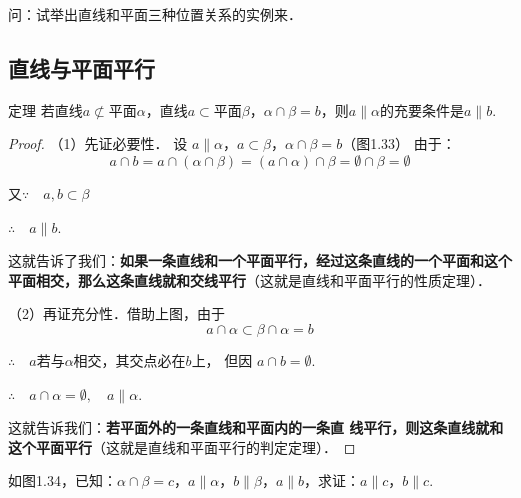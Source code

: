问：试举出直线和平面三种位置关系的实例来．

\subsection{直线与平面平行}
\begin{blk}
  {定理}
  若直线$a\not\subset$平面$\alpha$，直线$a\subset$平面$\beta$，$\alpha\cap \beta=b$，则$a\parallel\alpha$的充要条件是$a\parallel b$.
\end{blk}

\begin{proof}
（1）先证必要性．
设 $a\parallel\alpha$，$a\subset \beta$，$\alpha\cap\beta=b$（图1.33）
由于：
\[a\cap b=a\cap(\alpha\cap \beta)=(a\cap\alpha)\cap \beta=\emptyset\cap\beta=\emptyset\]

又$\because\quad a,b\subset\beta$

$\therefore\quad  a\parallel b$.

这就告诉了我们：\textbf{如果一条直线和一个平面平行，经过这条直线的一个平面和这个平面相交，那么这条直线就和交线平行}（这就是直线和平面平行的性质定理）．

\begin{figure}[htp]
  \centering
{}
  \caption{}
\end{figure}

（2）再证充分性．借助上图，由于
\[a\cap\alpha\subset \beta\cap\alpha=b\]

$\therefore\quad a$若与$\alpha$相交，其交点必在$b$上，
但因 $a\cap b=\emptyset$.

$\therefore\quad a\cap\alpha=\emptyset,\quad a\parallel\alpha$.

这就告诉我们：\textbf{若平面外的一条直线和平面内的一条直
线平行，则这条直线就和这个平面平行}（这就是直线和平面平行的判定定理）．
\end{proof}


\begin{example}\label{ex:1-fig34}
  如图1.34，已知：$\alpha\cap\beta=c$，$a\parallel \alpha$，$b\parallel \beta$，$a\parallel b$，求证：$a\parallel c$，$b\parallel c$.
\end{example}

